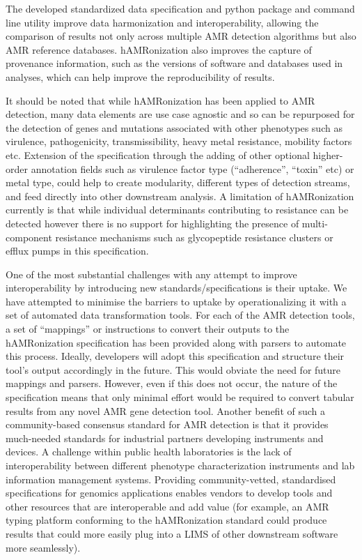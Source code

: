 The developed standardized data specification and python package and command line utility improve data harmonization and interoperability, allowing the comparison of results not only across multiple AMR detection algorithms but also AMR reference databases. hAMRonization also improves the capture of provenance information, such as the versions of software and databases used in analyses, which can help improve the reproducibility of results. 

It should be noted that while hAMRonization has been applied to AMR detection, many data elements are use case agnostic and so can be repurposed for the detection of genes and mutations associated with other phenotypes such as virulence, pathogenicity, transmissibility, heavy metal resistance, mobility factors etc. Extension of the specification through the adding of other optional higher-order annotation fields such as virulence factor type (“adherence”, “toxin” etc) or metal type, could help to create modularity, different types of detection streams, and feed directly into other downstream analysis. A limitation of hAMRonization currently is that while individual determinants contributing to resistance can be detected however there is no support for highlighting the presence of multi-component resistance mechanisms such as glycopeptide resistance clusters \cite{courvalin_vancomycin_2006} or efflux pumps \cite{okusu_acrab_1996} in this specification.

One of the most substantial challenges with any attempt to improve interoperability by introducing new standards/specifications is their uptake. We have attempted to minimise the barriers to uptake by operationalizing it with a set of automated data transformation tools. For each of the AMR detection tools, a set of  “mappings” or instructions to convert their outputs to the hAMRonization specification has been provided along with parsers to automate this process. Ideally,  developers will adopt this specification and structure their tool’s output accordingly in the future. This would obviate the need for future mappings and parsers. However, even if this does not occur, the nature of the specification means that only minimal effort would be required to convert tabular results from any novel AMR gene detection tool. Another benefit of such a community-based consensus standard for AMR detection is that it provides much-needed standards for industrial partners developing instruments and devices. A challenge within public health laboratories is the lack of interoperability between different phenotype characterization instruments and lab information management systems. Providing community-vetted, standardised specifications for genomics applications enables vendors to develop tools and other resources that are interoperable and add value (for example, an AMR typing platform conforming to the hAMRonization standard could produce results that could more easily plug into a LIMS of other downstream software more seamlessly).


